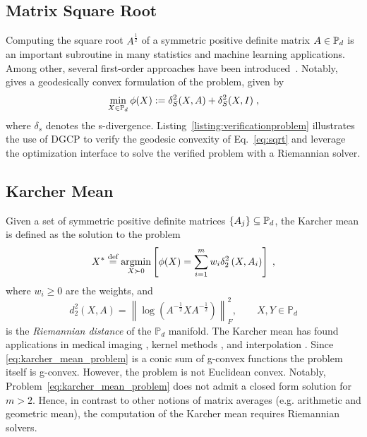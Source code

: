 \documentclass[twoside,11pt]{article}
\begin{document}
\subsection{Matrix Square Root}
Computing the square root $A^{\frac{1}{2}}$ of a symmetric positive definite matrix $A \in \mathbb{P}_d$ is an important subroutine in many statistics and machine learning applications. Among other, several first-order approaches have been introduced~\citep{jain2017global,sra2015matrix}. Notably,~\cite{sra2015matrix} gives a geodesically convex formulation of the problem, given by
\begin{equation}\label{eq:sqrt}
    \min _{X \in \mathbb{P}_d} \phi(X) := \delta_S^2(X, A)+\delta_S^2(X, I) \; ,
\end{equation}
where $\delta_s$ denotes the s-divergence. Listing~\ref{listing:verificationproblem} illustrates the use of DGCP to verify the geodesic convexity of Eq.~\ref{eq:sqrt} and leverage the optimization interface to solve the verified problem with a Riemannian solver.

\subsection{Karcher Mean}\label{sec:karcher_mean}

Given a set of symmetric positive definite matrices $\{A_j\} \subseteq \mathbb{P}_d$, the Karcher mean is defined as the solution to the problem
\begin{equation}\label{eq:karcher_mean_problem}
    X^* \stackrel{\text{def}}{=} \underset{X \succ 0}{\operatorname{argmin}}\left[\phi(X)=\sum_{i=1}^m w_i \delta_2^2\left(X, A_i\right)\right] \; ,
\end{equation}
where $w_i \geq 0$ are the weights, and 
\begin{equation}
    d^2_2(X, A) = \left \| \log \left(A^{-\frac{1}{2}}X A^{-\frac{1}{2}} \right)\right \|_F^2,
    \qquad X,Y \in \mathbb{P}_d
\end{equation}
is the \textit{Riemannian distance} of the $\mathbb{P}_d$ manifold. The Karcher mean has found applications in medical imaging \citep{Carmichael2013-wq}, kernel methods \citep{clustering}, and interpolation \citep{absil_interpolation}. Since \eqref{eq:karcher_mean_problem} is a conic sum of g-convex functions the problem itself is g-convex. However, the problem is not Euclidean convex. Notably, Problem~\ref{eq:karcher_mean_problem} does not admit a closed form solution for $m>2$. Hence, in contrast to other notions of matrix averages (e.g. arithmetic and geometric mean), the computation of the Karcher mean requires Riemannian solvers.
\end{document}
